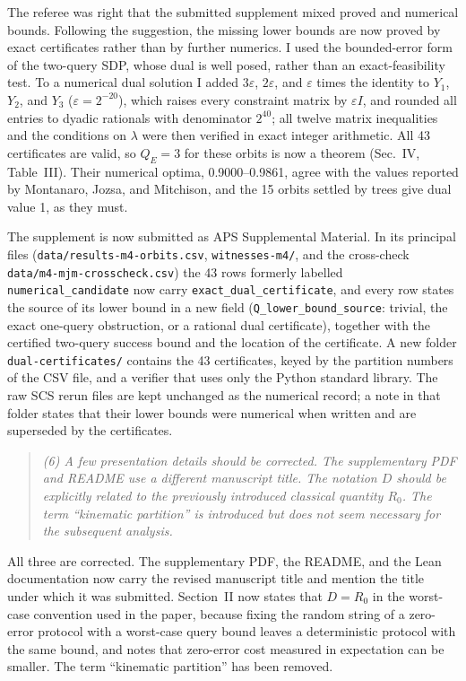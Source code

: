 \documentclass[11pt]{article}
\newenvironment{referee}{\begin{quote}\itshape}{\end{quote}}
\begin{document}
The referee was right that the submitted supplement mixed proved and
numerical bounds. Following the suggestion, the missing lower bounds are now
proved by exact certificates rather than by further numerics. I used the
bounded-error form of the two-query SDP, whose dual is well posed, rather than
an exact-feasibility test. To a numerical dual solution I added
\(3\varepsilon\), \(2\varepsilon\), and \(\varepsilon\) times the identity to
\(Y_1\), \(Y_2\), and \(Y_3\) (\(\varepsilon=2^{-20}\)), which raises every
constraint matrix by \(\varepsilon I\), and rounded all entries to dyadic
rationals with denominator \(2^{40}\); all twelve matrix inequalities and the
conditions on \(\lambda\) were then verified in exact integer arithmetic. All 43 certificates are valid, so \(Q_E=3\) for
these orbits is now a theorem (Sec.~IV, Table~III). Their numerical optima,
0.9000--0.9861, agree with the values reported by Montanaro, Jozsa, and
Mitchison, and the 15 orbits settled by trees give dual value 1, as they
must.

The supplement is now submitted as APS Supplemental Material. In its principal
files (\nolinkurl{data/results-m4-orbits.csv}, \nolinkurl{witnesses-m4/}, and the
cross-check \nolinkurl{data/m4-mjm-crosscheck.csv}) the 43 rows formerly labelled
\nolinkurl{numerical_candidate} now carry \nolinkurl{exact_dual_certificate}, and
every row states the source of its lower bound in a new field
(\nolinkurl{Q_lower_bound_source}: trivial, the exact one-query obstruction,
or a rational dual certificate), together with the certified two-query success
bound and the location of the certificate. A new folder
\nolinkurl{dual-certificates/} contains the 43 certificates, keyed by the
partition numbers of the CSV file, and a verifier that uses only the Python
standard library. The raw SCS rerun files are kept unchanged as the numerical
record; a note in that folder states that their lower bounds were numerical
when written and are superseded by the certificates.

\begin{referee}
(6) A few presentation details should be corrected. The supplementary PDF and
README use a different manuscript title. The notation \(D\) should be
explicitly related to the previously introduced classical quantity \(R_0\).
The term ``kinematic partition'' is introduced but does not seem necessary for
the subsequent analysis.
\end{referee}

All three are corrected. The supplementary PDF, the README, and the Lean
documentation now carry the revised manuscript title and mention the title
under which it was submitted. Section~II now states that \(D=R_0\) in the worst-case
convention used in the paper, because fixing the random string of a
zero-error protocol with a worst-case query bound leaves a deterministic
protocol with the same bound, and notes that zero-error cost measured in
expectation can be smaller. The term ``kinematic partition'' has been
removed.
\end{document}
